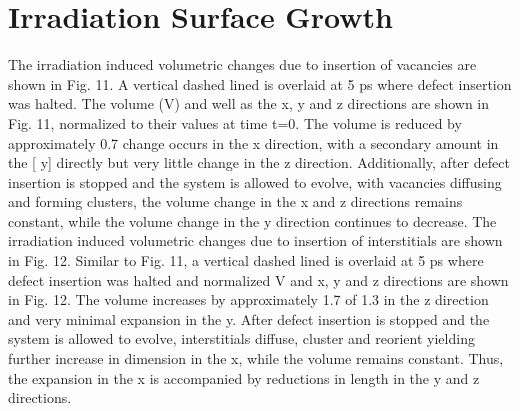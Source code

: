\documentclass[review]{elsarticle}
\begin{document}
\section{Irradiation Surface Growth}

The irradiation induced volumetric changes due to insertion of vacancies are shown in Fig. 11. A vertical
dashed lined is overlaid at 5 ps where defect insertion was halted. The volume (V) and well as the x, y
and z directions are shown in Fig. 11, normalized to their values at time t=0. The volume is reduced by
approximately 0.7%
change occurs in the x direction, with a secondary amount in the [ y] directly but very little change in the z
direction. Additionally, after defect insertion is stopped and the system is allowed to evolve, with vacancies diffusing and forming clusters, the volume change in the x and z directions remains constant, while the volume change in the y direction continues to decrease.
The irradiation induced volumetric changes due to insertion of interstitials are shown in Fig. 12. Similar
to Fig. 11, a vertical dashed lined is overlaid at 5 ps where defect insertion was halted and normalized V and
x, y and z directions are shown in Fig. 12. The volume increases by approximately 1.7%
of 1.3%
in the z direction and very minimal expansion in the y. After defect insertion is stopped and the system is
allowed to evolve, interstitials diffuse, cluster and reorient yielding further increase in dimension in the x,
while the volume remains constant. Thus, the expansion in the x is accompanied by reductions in length in the y and z directions.
\end{document}
